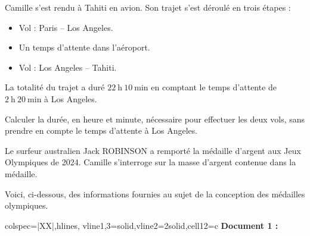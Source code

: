 \documentclass[12pt,a4paper,french]{article}
\begin{document}
\begin{énumérer}


\item Camille s'est rendu à Tahiti en avion. Son trajet s'est déroulé en trois étapes :
\begin{itemize}
\item Vol  : Paris – Los Angeles.
\item Un temps d'attente dans l'aéroport.
\item Vol  : Los Angeles – Tahiti.
\end{itemize}
La totalité du trajet a duré $22\ \text{h}\ 10\ \text{min}$ en comptant le temps d'attente de $2\ \text{h}\ 20\ \text{min}$ à Los Angeles.

Calculer la durée, en heure et minute, nécessaire pour effectuer les deux vols, sans prendre en compte le temps d'attente à Los Angeles.

\item Le surfeur australien Jack ROBINSON a remporté la médaille d'argent aux Jeux Olympiques de 2024. Camille s'interroge sur la masse d'argent contenue dans la médaille.

Voici, ci-dessous, des informations fournies au sujet de la conception des médailles olympiques.

\medskip
\begin{tblr}{colspec={|XX|},hlines, vline{1,3}={solid},vline{2}={2}{solid},cell{1}{2}={c}}
\textbf{Document 1 :}


\end{tblr}
\end{énumérer}
\end{document}
